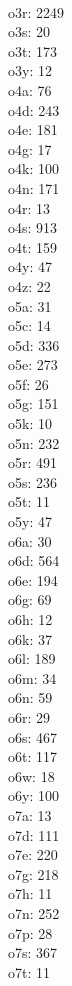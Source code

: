 \begin{multicols}{8}
  \\o3r: 2249
  \\o3s: 20
  \\o3t: 173
  \\o3y: 12
  \\o4a: 76
  \\o4d: 243
  \\o4e: 181
  \\o4g: 17
  \\o4k: 100
  \\o4n: 171
  \\o4r: 13
  \\o4s: 913
  \\o4t: 159
  \\o4y: 47
  \\o4z: 22
  \\o5a: 31
  \\o5c: 14
  \\o5d: 336
  \\o5e: 273
  \\o5f: 26
  \\o5g: 151
  \\o5k: 10
  \\o5n: 232
  \\o5r: 491
  \\o5s: 236
  \\o5t: 11
  \\o5y: 47
  \\o6a: 30
  \\o6d: 564
  \\o6e: 194
  \\o6g: 69
  \\o6h: 12
  \\o6k: 37
  \\o6l: 189
  \\o6m: 34
  \\o6n: 59
  \\o6r: 29
  \\o6s: 467
  \\o6t: 117
  \\o6w: 18
  \\o6y: 100
  \\o7a: 13
  \\o7d: 111
  \\o7e: 220
  \\o7g: 218
  \\o7h: 11
  \\o7n: 252
  \\o7p: 28
  \\o7s: 367
  \\o7t: 11

\end{multicols}
